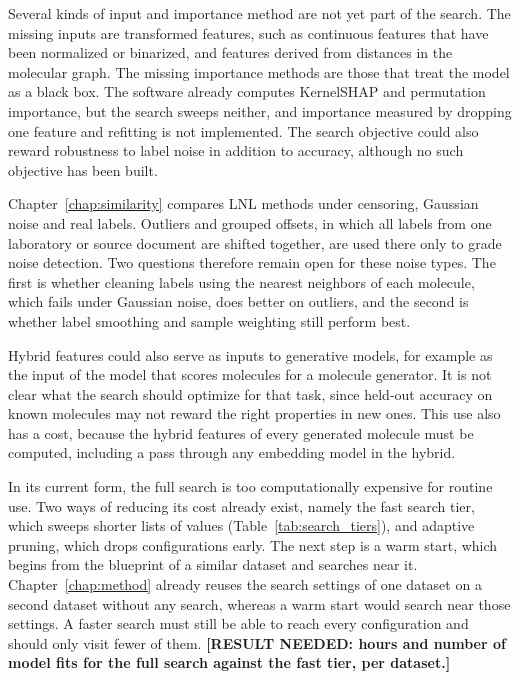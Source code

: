 Several kinds of input and importance method are not yet part of the search. The missing inputs are transformed features, such as continuous features that have been normalized or binarized, and features derived from distances in the molecular graph. The missing importance methods are those that treat the model as a black box. The software already computes KernelSHAP and permutation importance, but the search sweeps neither, and importance measured by dropping one feature and refitting is not implemented. The search objective could also reward robustness to label noise in addition to accuracy, although no such objective has been built.

Chapter~\ref{chap:similarity} compares LNL methods under censoring, Gaussian noise and real labels. Outliers and grouped offsets, in which all labels from one laboratory or source document are shifted together, are used there only to grade noise detection. Two questions therefore remain open for these noise types. The first is whether cleaning labels using the nearest neighbors of each molecule, which fails under Gaussian noise, does better on outliers, and the second is whether label smoothing and sample weighting still perform best.

Hybrid features could also serve as inputs to generative models, for example as the input of the model that scores molecules for a molecule generator. It is not clear what the search should optimize for that task, since held-out accuracy on known molecules may not reward the right properties in new ones. This use also has a cost, because the hybrid features of every generated molecule must be computed, including a pass through any embedding model in the hybrid.

In its current form, the full search is too computationally expensive for routine use. Two ways of reducing its cost already exist, namely the fast search tier, which sweeps shorter lists of values (Table~\ref{tab:search_tiers}), and adaptive pruning, which drops configurations early. The next step is a warm start, which begins from the blueprint of a similar dataset and searches near it. Chapter~\ref{chap:method} already reuses the search settings of one dataset on a second dataset without any search, whereas a warm start would search near those settings. A faster search must still be able to reach every configuration and should only visit fewer of them. \textbf{[RESULT NEEDED: hours and number of model fits for the full search against the fast tier, per dataset.]}

